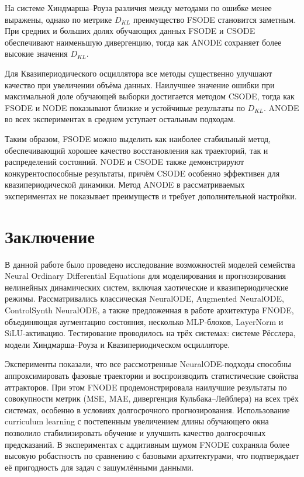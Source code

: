 \documentclass[PMI,VKR]{HSEUniversity}
\begin{document}
На системе Хиндмарша--Роуза различия между методами по ошибке менее выражены, однако по метрике $D_{KL}$ преимущество FSODE становится заметным. При средних и больших долях обучающих данных FSODE и CSODE обеспечивают наименьшую дивергенцию, тогда как ANODE сохраняет более высокие значения $D_{KL}$.

Для Квазипериодического осциллятора все методы существенно улучшают качество при увеличении объёма данных. Наилучшее значение ошибки при максимальной доле обучающей выборки достигается методом CSODE, тогда как FSODE и NODE показывают близкие и устойчивые результаты по $D_{KL}$. ANODE во всех экспериментах в среднем уступает остальным подходам.

Таким образом, FSODE можно выделить как наиболее стабильный метод, обеспечивающий хорошее качество восстановления как траекторий, так и распределений состояний. NODE и CSODE также демонстрируют конкурентоспособные результаты, причём CSODE особенно эффективен для квазипериодической динамики. Метод ANODE в рассматриваемых экспериментах не показывает преимуществ и требует дополнительной настройки.


\chapter{Заключение}

В данной работе было проведено исследование возможностей моделей семейства Neural Ordinary Differential Equations для моделирования и прогнозирования нелинейных динамических систем, включая хаотические и квазипериодические режимы. 
Рассматривались классическая NeuralODE, Augmented NeuralODE, ControlSynth NeuralODE, а также предложенная в работе архитектура FNODE, объединяющая аугментацию состояния, несколько MLP-блоков, LayerNorm и SiLU-активацию. 
Тестирование проводилось на трёх системах: системе Рёсслера, модели Хиндмарша–Роуза и Квазипериодическом осцилляторе.

Эксперименты показали, что все рассмотренные NeuralODE-подходы способны аппроксимировать фазовые траектории и воспроизводить статистические свойства аттракторов. 
При этом FNODE продемонстрировала наилучшие результаты по совокупности метрик (MSE, MAE, дивергенция Кульбака–Лейблера) на всех трёх системах, особенно в условиях долгосрочного прогнозирования. 
Использование curriculum learning с постепенным увеличением длины обучающего окна позволило стабилизировать обучение и улучшить качество долгосрочных предсказаний. 
В экспериментах с аддитивным шумом FNODE сохраняла более высокую робастность по сравнению с базовыми архитектурами, что подтверждает её пригодность для задач с зашумлёнными данными.
\end{document}
